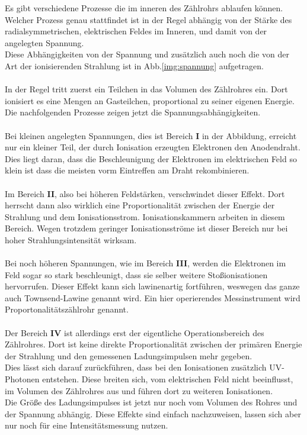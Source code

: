 \noindent
Es gibt verschiedene Prozesse die im inneren des Zählrohrs ablaufen können. 
Welcher Prozess genau stattfindet ist in der Regel abhängig von der Stärke des radialsymmetrischen, elektrischen Feldes im Inneren, und damit von der angelegten Spannung.\\
Diese Abhängigkeiten von der Spannung und zusätzlich auch noch die von der Art der ionisierenden Strahlung ist in Abb.\ref{img:spannung} aufgetragen.\\\\
In der Regel tritt zuerst ein Teilchen in das Volumen des Zählrohres ein. Dort ionisiert es eine Mengen an Gasteilchen, proportional zu seiner eigenen Energie.\\
Die nachfolgenden Prozesse zeigen jetzt die Spannungsabhängigkeiten.\\\\
Bei kleinen angelegten Spannungen, dies ist Bereich \textbf{I} in der Abbildung, erreicht nur ein kleiner Teil, der durch Ionisation erzeugten Elektronen den Anodendraht. 
Dies liegt daran, dass die Beschleunigung der Elektronen im elektrischen Feld so klein ist dass die meisten vorm Eintreffen am Draht rekombinieren. \\\\
Im Bereich \textbf{II}, also bei höheren Feldstärken, verschwindet dieser Effekt. Dort herrscht dann also wirklich eine Proportionalität zwischen der Energie der Strahlung und dem Ionisationsstrom.
Ionisationskammern arbeiten in diesem Bereich. Wegen trotzdem geringer Ionisationsströme ist dieser Bereich nur bei hoher Strahlungsintensität wirksam.\\\\
Bei noch höheren Spannungen, wie im Bereich \textbf{III}, werden die Elektronen im Feld sogar so stark beschleunigt, dass sie selber weitere Stoßionisationen hervorrufen.
Dieser Effekt kann sich lawinenartig fortführen, weswegen das ganze auch Townsend-Lawine genannt wird. 
Ein hier operierendes Messinstrument wird Proportonalitätszählrohr genannt.\\\\
Der Bereich \textbf{IV} ist allerdings erst der eigentliche Operationsbereich des Zählrohres. 
Dort ist keine direkte Proportionalität zwischen der primären Energie der Strahlung und den gemessenen Ladungsimpulsen mehr gegeben.\\
Dies lässt sich darauf zurückführen, dass bei den Ionisationen zusätzlich UV-Photonen entstehen.
Diese breiten sich, vom elektrischen Feld nicht beeinflusst, im Volumen des Zählrohres aus und führen dort zu weiteren Ionisationen.\\
Die Größe des Ladungsimpulses ist jetzt nur noch vom Volumen des Rohres und der Spannung abhängig.
Diese Effekte sind einfach nachzuweisen, lassen sich aber nur noch für eine Intensitätsmessung nutzen.\\\\

